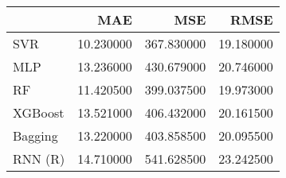 \begin{tabular}{lrrr}
\toprule
 & MAE & MSE & RMSE \\
\midrule
SVR & 10.230000 & 367.830000 & 19.180000 \\
MLP & 13.236000 & 430.679000 & 20.746000 \\
RF & 11.420500 & 399.037500 & 19.973000 \\
XGBoost & 13.521000 & 406.432000 & 20.161500 \\
Bagging & 13.220000 & 403.858500 & 20.095500 \\
RNN (R) & 14.710000 & 541.628500 & 23.242500 \\
\bottomrule
\end{tabular}
